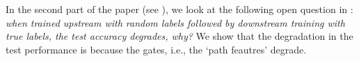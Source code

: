 


In the second part of the paper (see ), we look at the following open question in \citep{randlabel}: \emph{when trained upstream with random labels followed by downstream training with true labels, the test accuracy degrades, why?} We show that the degradation in the test performance is because the gates, i.e., the `path feautres' degrade.




